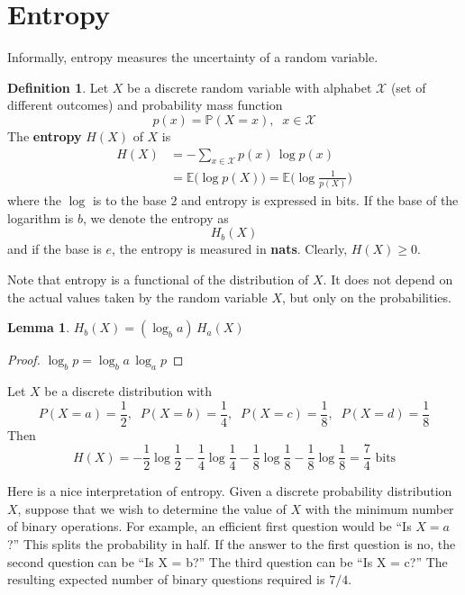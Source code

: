 \documentclass[a4paper, 12pt]{report}
\newtheorem{lemma}[theorem]{Lemma}
\theoremstyle{remark}
\theoremstyle{definition}
\newtheorem{definition}{Definition}[section]
\begin{document}
\section{Entropy}
Informally, entropy measures the uncertainty of a random variable.
\begin{definition}
Let $X$ be a discrete random variable with alphabet $\mathcal{X}$ (set of different outcomes) and probability mass function 
\[p(x) = \mathbb{P}(X = x), \;\; x \in \mathcal{X}\]
The \textbf{entropy} $H(X)$ of $X$ is
\begin{align*}
    H(X) & = - \sum_{x \in \mathcal{X}} p(x) \, \log p(x) \\
    & = \mathbb{E} \big( \log p(X)\big) = \mathbb{E} \Big( \log \frac{1}{p(X)} \Big)
\end{align*}
where the $\log$ is to the base $2$ and entropy is expressed in bits. If the base of the logarithm is $b$, we denote the entropy as 
\[H_b (X)\]
and if the base is $e$, the entropy is measured in \textbf{nats}. Clearly, $H(X) \geq 0$. 
\end{definition} 

Note that entropy is a functional of the distribution of $X$. It does not depend on the actual values taken by the random variable $X$, but only on the probabilities. 

\begin{lemma}
$H_b (X) = (\log_b a)\, H_a (X)$
\end{lemma}
\begin{proof}
$\log_b p = \log_b a \, \log_a p$
\end{proof}

\begin{example}
Let $X$ be a discrete distribution with
\[P(X = a) = \frac{1}{2}, \;\; P(X = b) = \frac{1}{4}, \;\; P(X = c) = \frac{1}{8}, \;\; P(X = d) = \frac{1}{8}\]
Then 
\[H(X) = -\frac{1}{2} \log \frac{1}{2} -\frac{1}{4} \log \frac{1}{4} -\frac{1}{8} \log \frac{1}{8} -\frac{1}{8} \log \frac{1}{8} = \frac{7}{4} \text{ bits} \]
\end{example}

Here is a nice interpretation of entropy. Given a discrete probability distribution $X$, suppose that we wish to determine the value of $X$ with the minimum number of binary operations. For example, an efficient first question would be “Is $X = a$?” This splits the probability in half. If the answer to the first question is no, the second question can be “Is X = b?” The third question can be “Is X = c?” The resulting expected number of binary questions required is $7/4$. 
\end{document}
